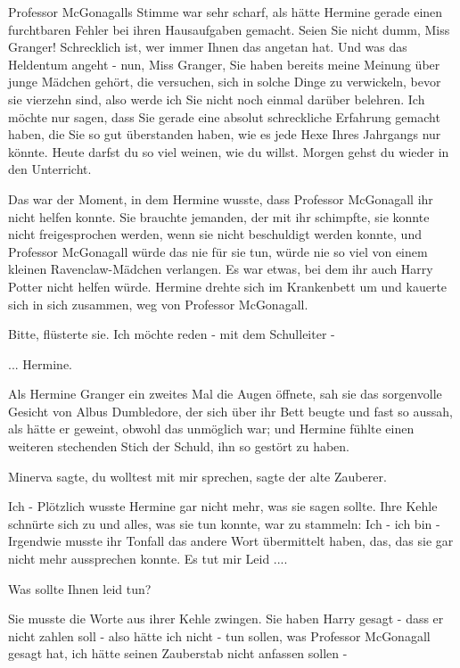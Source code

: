 Professor McGonagalls Stimme war sehr scharf, als hätte Hermine gerade einen
furchtbaren Fehler bei ihren Hausaufgaben gemacht. \glqq{}Seien Sie nicht dumm,
Miss Granger! Schrecklich ist, wer immer Ihnen das angetan hat. Und was das
Heldentum angeht - nun, Miss Granger, Sie haben bereits meine Meinung über junge
Mädchen gehört, die versuchen, sich in solche Dinge zu verwickeln, bevor sie
vierzehn sind, also werde ich Sie nicht noch einmal darüber belehren. Ich möchte
nur sagen, dass Sie gerade eine absolut schreckliche Erfahrung gemacht haben,
die Sie so gut überstanden haben, wie es jede Hexe Ihres Jahrgangs nur könnte.
Heute darfst du so viel weinen, wie du willst. Morgen gehst du wieder in den
Unterricht.\grqq{}

Das war der Moment, in dem Hermine wusste, dass Professor McGonagall ihr nicht
helfen konnte. Sie brauchte jemanden, der mit ihr schimpfte, sie konnte nicht
freigesprochen werden, wenn sie nicht beschuldigt werden konnte, und Professor
McGonagall würde das nie für sie tun, würde nie so viel von einem kleinen
Ravenclaw-Mädchen verlangen. Es war etwas, bei dem ihr auch Harry Potter nicht
helfen würde. Hermine drehte sich im Krankenbett um und kauerte sich in sich
zusammen, weg von Professor McGonagall.

\glqq{}Bitte\grqq{}, flüsterte sie. \glqq{}Ich möchte reden - mit dem Schulleiter
-\grqq{}

... \glqq{}Hermine.\grqq{}

Als Hermine Granger ein zweites Mal die Augen öffnete, sah sie das sorgenvolle
Gesicht von Albus Dumbledore, der sich über ihr Bett beugte und fast so aussah,
als hätte er geweint, obwohl das unmöglich war; und Hermine fühlte einen
weiteren stechenden Stich der Schuld, ihn so gestört zu haben.

\glqq{}Minerva sagte, du wolltest mit mir sprechen\grqq{}, sagte der alte
Zauberer.

\glqq{}Ich -\grqq{} Plötzlich wusste Hermine gar nicht mehr, was sie sagen
sollte. Ihre Kehle schnürte sich zu und alles, was sie tun konnte, war zu
stammeln: \glqq{}Ich - ich bin -\grqq{} Irgendwie musste ihr Tonfall das andere
Wort übermittelt haben, das, das sie gar nicht mehr aussprechen konnte. \glqq{}Es
tut mir Leid ....\grqq{}

\glqq{}Was sollte Ihnen leid tun?\grqq{}

Sie musste die Worte aus ihrer Kehle zwingen. \glqq{}Sie haben Harry gesagt -
dass er nicht zahlen soll - also hätte ich nicht - tun sollen, was Professor
McGonagall gesagt hat, ich hätte seinen Zauberstab nicht anfassen sollen
-\grqq{}

